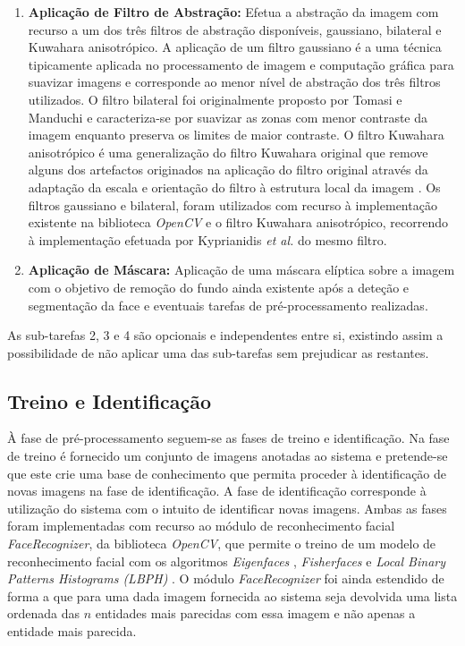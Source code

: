 \documentclass{llncs}
\begin{document}
\begin{enumerate}
\item \textbf{Aplicação de Filtro de Abstração:} Efetua a abstração da imagem com recurso a um dos três filtros de abstração disponíveis, gaussiano, bilateral e Kuwahara anisotrópico. A aplicação de um filtro gaussiano é a uma técnica tipicamente aplicada no processamento de imagem  e computação gráfica para suavizar imagens \cite{373563} e corresponde ao menor nível de abstração dos três filtros utilizados. O filtro bilateral foi originalmente proposto por Tomasi e Manduchi \cite{Tomasi1998} e caracteriza-se por suavizar as zonas com menor contraste da imagem enquanto preserva os limites de maior contraste. O filtro Kuwahara anisotrópico é uma generalização do filtro Kuwahara original que remove alguns dos artefactos originados na aplicação do filtro original através da adaptação da escala e orientação do filtro à estrutura local da imagem \cite{Kyprianidis2009}. Os filtros gaussiano e bilateral, foram utilizados com recurso à implementação existente na biblioteca \textit{OpenCV} e o filtro Kuwahara anisotrópico, recorrendo à implementação efetuada por Kyprianidis \textit{et al.} \cite{Kyprianidis2009} do mesmo filtro.
\item \textbf{Aplicação de Máscara:} Aplicação de uma máscara elíptica sobre a imagem com o objetivo de remoção do fundo ainda existente após a deteção e segmentação da face e eventuais tarefas de pré-processamento realizadas.
\end{enumerate}

As sub-tarefas 2, 3 e 4 são opcionais e independentes entre si, existindo assim a possibilidade de não aplicar uma das sub-tarefas sem prejudicar as restantes.

\subsection{Treino e Identificação}\label{sec:treino-id}
À fase de pré-processamento seguem-se as fases de treino e identificação. Na fase de treino é fornecido um conjunto de imagens anotadas ao sistema e pretende-se que este crie uma base de conhecimento que permita proceder à identificação de novas imagens na fase de identificação. A fase de identificação corresponde à utilização do sistema com o intuito de identificar novas imagens. Ambas as fases foram implementadas com recurso ao módulo de reconhecimento facial \textit{FaceRecognizer}, da biblioteca \textit{OpenCV}, que permite o treino de um modelo de reconhecimento facial com os algoritmos \textit{Eigenfaces} \cite{Turk1991}, \textit{Fisherfaces} \cite{Belhumeur1997,Zhao1998} e \textit{Local Binary Patterns Histograms  (LBPH)} \cite{ahonen2004face}. O módulo \textit{FaceRecognizer} foi ainda estendido de forma a que para uma dada imagem fornecida ao sistema seja devolvida uma lista ordenada das $n$ entidades mais parecidas com essa imagem e não apenas a entidade mais parecida.
\end{document}

